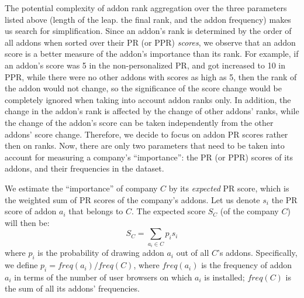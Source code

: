 \documentclass[11pt,oneside]{book}
\begin{document}
The potential complexity of addon rank aggregation over the three parameters listed above (length of the leap. the final rank, and the addon frequency) makes us search for simplification. Since an addon's rank is determined by the order of all addons when sorted over their PR (or PPR) \emph{scores}, we observe that an addon score is a better measure of the addon's importance than its rank. For example, if an addon's score was 5 in the non-personalized PR, and got increased to 10 in PPR, while there were no other addons with scores as high as 5, then the rank of the addon would not change, so the significance of the score change would be completely ignored when taking into account addon ranks only. In addition, the change in the addon's rank is affected by the change of other addons' ranks, while the change of the addon's score can be taken independently from the other addons' score change. Therefore, we decide to focus on addon PR scores rather then on ranks. Now, there are only two parameters that need to be taken into account for measuring a company's ``importance'': the PR (or PPR) scores of its addons, and their frequencies in the dataset.

We estimate the ``importance'' of company $C$ by its \emph{expected} PR score, which is the weighted sum of PR scores of the company's addons. Let us denote $s_i$ the PR score of addon $a_i$ that belongs to $C$. The expected score $S_C$ (of the company $C$) will then be:
$$
S_C = \sum_{a_i \in C} p_i s_i
$$
where $p_i$ is the probability of drawing addon $a_i$ out of all $C$'s addons. Specifically, we define $p_i = freq(a_i) / freq(C)$, where $freq(a_i)$ is the frequency of addon $a_i$ in terms of the number of user browsers on which $a_i$ is installed; $freq(C)$ is the sum of all its addons' frequencies.


\end{document}
